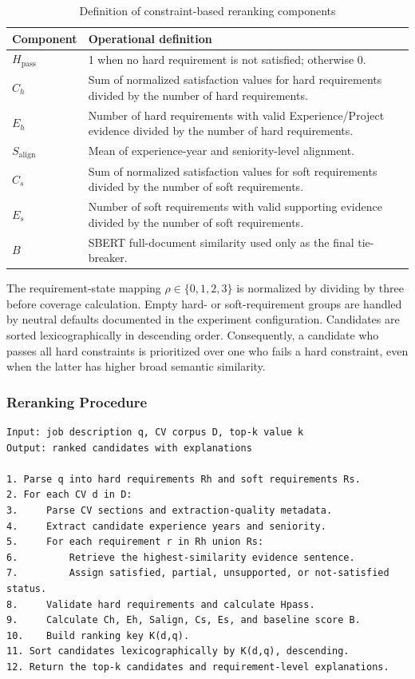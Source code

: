 \documentclass[12pt,a4paper,oneside]{report}
\begin{document}
\begin{table}[htbp]
\centering
\caption{Definition of constraint-based reranking components}
\label{tab:ranking-components}
\begin{tabularx}{\textwidth}{>{\bfseries}p{}X}
\toprule
Component & Operational definition \\
\midrule
$H_{\mathrm{pass}}$ & 1 when no hard requirement is not satisfied; otherwise 0. \\
$C_h$ & Sum of normalized satisfaction values for hard requirements divided by the number of hard requirements. \\
$E_h$ & Number of hard requirements with valid Experience/Project evidence divided by the number of hard requirements. \\
$S_{\mathrm{align}}$ & Mean of experience-year and seniority-level alignment. \\
$C_s$ & Sum of normalized satisfaction values for soft requirements divided by the number of soft requirements. \\
$E_s$ & Number of soft requirements with valid supporting evidence divided by the number of soft requirements. \\
$B$ & SBERT full-document similarity used only as the final tie-breaker. \\
\bottomrule
\end{tabularx}
\end{table}

The requirement-state mapping $\rho\in\{0,1,2,3\}$ is normalized by dividing by three before coverage calculation. Empty hard- or soft-requirement groups are handled by neutral defaults documented in the experiment configuration. Candidates are sorted lexicographically in descending order. Consequently, a candidate who passes all hard constraints is prioritized over one who fails a hard constraint, even when the latter has higher broad semantic similarity.

\subsubsection{Reranking Procedure}
\begin{lstlisting}[basicstyle=\ttfamily\small,frame=single,breaklines=true,caption={Requirement-aware and evidence-aware reranking procedure},label={alg:reranking}]
Input: job description q, CV corpus D, top-k value k
Output: ranked candidates with explanations

1. Parse q into hard requirements Rh and soft requirements Rs.
2. For each CV d in D:
3.     Parse CV sections and extraction-quality metadata.
4.     Extract candidate experience years and seniority.
5.     For each requirement r in Rh union Rs:
6.         Retrieve the highest-similarity evidence sentence.
7.         Assign satisfied, partial, unsupported, or not-satisfied status.
8.     Validate hard requirements and calculate Hpass.
9.     Calculate Ch, Eh, Salign, Cs, Es, and baseline score B.
10.    Build ranking key K(d,q).
11. Sort candidates lexicographically by K(d,q), descending.
12. Return the top-k candidates and requirement-level explanations.
\end{lstlisting}
\end{document}
